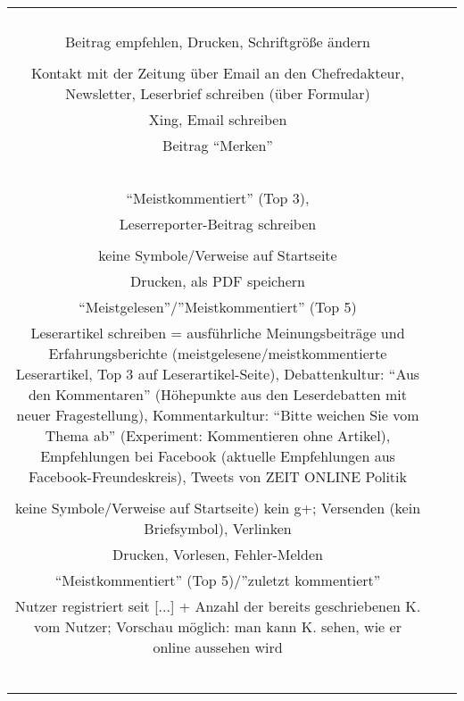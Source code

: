 \begin{landscape}
\begin{tabular}{ccc}
{{		\\
		\\
		&
		\\
		\\
		Beitrag empfehlen, Drucken, Schriftgröße ändern\\
		\\
		Kontakt mit der Zeitung über Email an den Chefredakteur, Newsletter, Leserbrief schreiben (über Formular)
		&
		\\
		Xing, Email schreiben\\
		Beitrag ``Merken''\\
		\\
		\\
		&
		\\
		\\
		\\
		``Meistkommentiert''  (Top 3), \\
		Leserreporter-Beitrag schreiben \\
		&
		\\
		keine Symbole/Verweise auf Startseite\\
		Drucken, als PDF speichern\\
		``Meistgelesen''/''Meistkommentiert'' (Top 5)\\
		Leserartikel schreiben = ausführliche Meinungsbeiträge und Erfahrungsberichte (meistgelesene/meistkommentierte Leserartikel, Top 3 auf Leserartikel-Seite), Debattenkultur: ``Aus den Kommentaren'' (Höhepunkte aus den Leserdebatten mit neuer Fragestellung), Kommentarkultur: ``Bitte weichen Sie vom Thema ab'' (Experiment: Kommentieren ohne Artikel), Empfehlungen bei Facebook (aktuelle Empfehlungen aus Facebook-Freundeskreis), Tweets von ZEIT ONLINE Politik\\
		&
		\\
		keine Symbole/Verweise auf Startseite) kein g+; Versenden (kein Briefsymbol), Verlinken\\
		Drucken, Vorlesen, Fehler-Melden\\
		``Meistkommentiert'' (Top 5)/''zuletzt kommentiert''\\
		Nutzer registriert seit [...] + Anzahl der bereits geschriebenen K. vom Nutzer; Vorschau möglich: man kann K. sehen, wie er online aussehen wird\\
		&
		\\
		\\
		\\
		\\
		\\
}}
\end{tabular}
\end{landscape}
